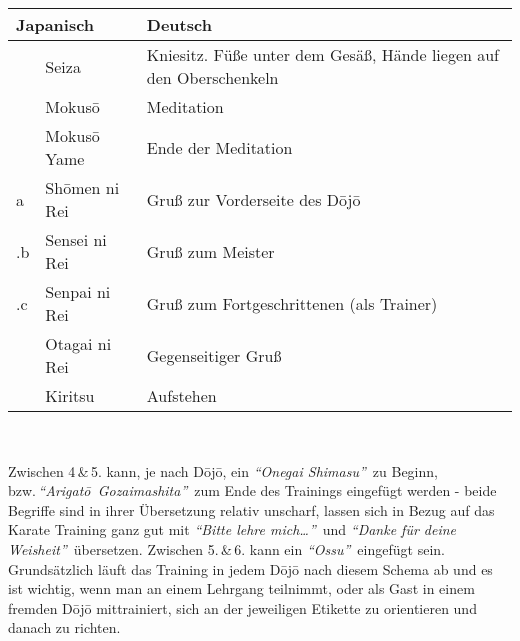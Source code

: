 	\setcounter{num}{0}\setcounter{numz}{0}
	\null\vfill\null	
	\begin{tabularx}{\textwidth}{llX}
		\multicolumn{2}{l}{\textbf{Japanisch}} 	& \textbf{Deutsch}\\
		\midrule
		\ctu		& Seiza 				& Kniesitz. Füße unter dem Gesäß, Hände liegen auf den Oberschenkeln\\
		\ctu		& Mokus\={o}			& Meditation\\
		\ctu		& Mokus\={o} Yame		& Ende der Meditation\\
		\ctu a		& Sh\={o}men ni Rei		& Gruß zur Vorderseite des D\={o}j\={o}\\
		\thenum .b	& Sensei ni Rei			& Gruß zum Meister\\
		\thenum .c	& Senpai ni Rei			& Gruß zum Fortgeschrittenen (als Trainer)\\
		\ctu		& Otagai ni Rei			& Gegenseitiger Gruß\\
		\ctu		& Kiritsu				& Aufstehen\\		
		\midrule
	\end{tabularx}\\\null\vfill\null
	\begin{center}
		\parbox{\textwidth-2\tabcolsep}{Zwischen 4\,\&\,5. kann, je nach D\={o}j\={o}, ein \textit{\textquotedblleft Onegai Shimasu\textquotedblright}~zu Beginn, bzw.\,\textit{\mbox{\textquotedblleft Arigat\={o} Gozaimashita\textquotedblright}}~zum Ende des Trainings eingefügt werden - beide Begriffe sind in ihrer Übersetzung relativ unscharf, lassen sich in Bezug auf das Karate Training ganz gut mit \textit{\textquotedblleft Bitte lehre mich\dots\textquotedblright}~und \textit{\textquotedblleft Danke für deine Weisheit\textquotedblright}~übersetzen. Zwischen 5.\,\&\,6. kann ein \textit{\textquotedblleft Ossu\textquotedblright}~eingefügt sein. Grundsätzlich läuft das Training in jedem D\={o}j\={o} nach diesem Schema ab und es ist wichtig, wenn man an einem Lehrgang teilnimmt, oder als Gast in einem fremden D\={o}j\={o} mittrainiert, sich an der jeweiligen Etikette zu orientieren und danach zu richten.}
	\end{center}\null\vfill\null